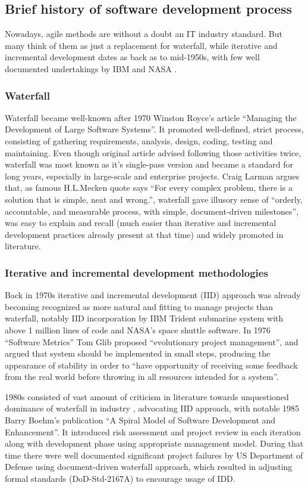 \documentclass{article}
\begin{document}
\subsection{Brief history of software development process}
Nowadays, agile methods are without a doubt an IT industry standard. But many think of them as just a replacement for waterfall, while iterative and incremental development dates as back as to mid-1950s, with few well documented undertakings by IBM and NASA \cite{larman2003iterative}.

\subsubsection{Waterfall}
Waterfall became well-known after 1970 Winston Royce's article ``Managing the Development of Large Software Systems''. It promoted well-defined, strict process, consisting of gathering requirements, analysis, design, coding, testing and maintaining. Even though original article advised following those activities twice, waterfall was most known as it's single-pass version and became a standard for long years, especially in large-scale and enterprise projects. Craig Larman \cite{larman2003iterative} argues that, as famous H.L.Mecken quote says ``For every complex problem, there is a solution that is simple, neat and wrong.'', waterfall gave illusory sense of ``orderly, accountable, and measurable process, with simple, document-driven milestones'', was easy to explain and recall (much easier than iterative and incremental development practices already present at that time) and widely promoted in literature.

\subsubsection{Iterative and incremental development methodologies}
Back in 1970s iterative and incremental development (IID) approach was already becoming recognized as more natural and fitting to manage projects than waterfall, notably IID incorporation by IBM Trident submarine system with above 1 million lines of code and NASA's space shuttle software. In 1976 ``Software Metrics'' Tom Glib proposed ``evolutionary project management'', and argued that system should be implemented in small steps, producing the appearance of stability in order to ``have opportunity of receiving some feedback from the real world before throwing in all resources intended for a system''.

1980s consisted of vast amount of criticism in literature towards unquestioned dominance of waterfall in industry \cite{larman2003iterative}, advocating IID approach, with notable 1985 Barry Boehm's publication ``A Spiral Model of Software Development and Enhancement''. It introduced risk assessment and project review in each iteration along with development phase using appropriate management model. During that time there were well documented significant project failures by US Department of Defense using document-driven waterfall approach, which resulted in adjusting formal standards (DoD-Std-2167A) to encourage usage of IDD.
\end{document}
